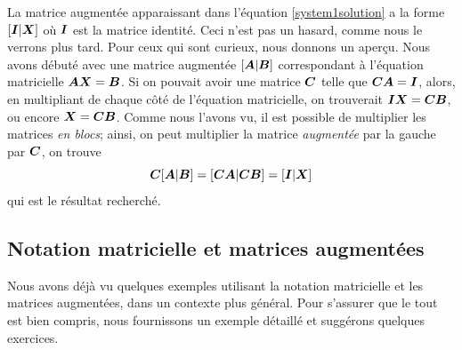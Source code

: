  La matrice augmentée apparaissant dans l'équation \eqref{system1solution} a
 la forme $[\boldsymbol{I} | \boldsymbol{X}]$ où $\boldsymbol{I}$ est la matrice identité. Ceci n'est pas
 un hasard, comme nous le verrons plus tard.  Pour ceux qui sont curieux,
nous donnons un aperçu.  Nous avons débuté avec une matrice augmentée
$[\boldsymbol{A} | \boldsymbol{B}]$ correspondant à l'équation matricielle
$\boldsymbol{A} \boldsymbol{X} = \boldsymbol{B}$.  Si on pouvait avoir une matrice $\boldsymbol{C}$ telle que
$\boldsymbol{C}\boldsymbol{A} = \boldsymbol{I}$, alors, en multipliant de chaque côté de l'équation
matricielle, on trouverait $\boldsymbol{I} \boldsymbol{X} = \boldsymbol{C}\boldsymbol{B}$, ou encore
$\boldsymbol{X} = \boldsymbol{C}\boldsymbol{B}$.  Comme nous l'avons vu, il est possible
de multiplier les matrices \textit{en blocs}; ainsi, on peut
multiplier la matrice \textit{augmentée} par la gauche par $\boldsymbol{C}$, on trouve
\[
\boldsymbol{C} [\boldsymbol{A} | \boldsymbol{B}] = [\boldsymbol{C}\boldsymbol{A} | \boldsymbol{C} \boldsymbol{B}] = [\boldsymbol{I} | \boldsymbol{X}]
\]
qui est le résultat recherché.

 
\subsection{Notation matricielle et matrices augmentées}
 Nous avons déjà vu quelques exemples utilisant la notation matricielle et
 les matrices augmentées, dans un contexte plus général.  Pour s'assurer
 que le tout est bien compris, nous fournissons un exemple détaillé et
 suggérons quelques exercices.
 
